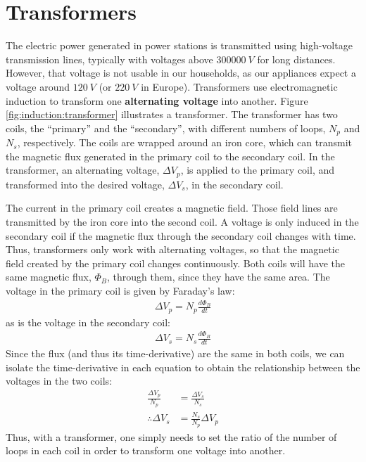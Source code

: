 \section{Transformers}
The electric power generated in power stations is transmitted using high-voltage transmission lines, typically with voltages above $\SI{300000}{V}$ for long distances. However, that voltage is not usable in our households, as our appliances expect a voltage around $\SI{120}{V}$ (or $\SI{220}{V}$ in Europe). Transformers use electromagnetic induction to transform one \textbf{alternating voltage} into another. Figure \ref{fig:induction:transformer} illustrates a transformer.
The transformer has two coils, the ``primary'' and the ``secondary'', with different numbers of loops, $N_p$ and $N_s$, respectively. The coils are wrapped around an iron core, which can transmit the magnetic flux generated in the primary coil to the secondary coil. In the transformer, an alternating voltage, $\Delta V_p$, is applied to the primary coil, and transformed into the desired voltage, $\Delta V_s$, in the secondary coil. 

The current in the primary coil creates a magnetic field. Those field lines are transmitted by the iron core into the second coil. A voltage is only induced in the secondary coil if the magnetic flux through the secondary coil changes with time. Thus, transformers only work with alternating voltages, so that the magnetic field created by the primary coil changes continuously. Both coils will have the same magnetic flux, $\Phi_B$, through them, since they have the same area. The voltage in the primary coil is given by Faraday's law:
\begin{align*}
\Delta V_p = N_p \frac{d\Phi_B}{dt}
\end{align*}
as is the voltage in the secondary coil:
\begin{align*}
\Delta V_s = N_s \frac{d\Phi_B}{dt}
\end{align*}
Since the flux (and thus its time-derivative) are the same in both coils, we can isolate the time-derivative in each equation to obtain the relationship between the voltages in the two coils:
\begin{align*}
\frac{\Delta V_p}{N_p}&=\frac{\Delta V_s}{N_s}\\
\therefore \Delta V_s &= \frac{N_s}{N_p}\Delta V_p
\end{align*}
Thus, with a transformer, one simply needs to set the ratio of the number of loops in each coil in order to transform one voltage into another.

